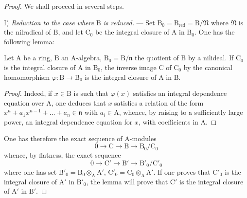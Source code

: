 \begin{proof}
We shall proceed in several steps.

I) \emph{Reduction to the case where} $\mathrm{B}$ \emph{is reduced.} --- Set $\mathrm{B}_0=\mathrm{B}_{\mathrm{red}}=\mathrm{B}/\mathfrak{N}$ where $\mathfrak{N}$ is the
nilradical of $\mathrm{B}$, and let $\mathrm{C}_0$ be the integral closure of $\mathrm{A}$ in $\mathrm{B}_0$. One has the following lemma:

\begin{lemma}[6.14.4.1]
\label{IV.6.14.4.1}
Let $\mathrm{A}$ be a ring, $\mathrm{B}$ an $\mathrm{A}$-algebra, $\mathrm{B}_0=\mathrm{B}/\mathfrak{n}$ the quotient of $\mathrm{B}$
by a nilideal. If $\mathrm{C}_0$ is the integral closure of $\mathrm{A}$ in $\mathrm{B}_0$, the inverse image $\mathrm{C}$ of $\mathrm{C}_0$ by
the canonical homomorphism $\varphi:\mathrm{B}\to\mathrm{B}_0$ is the integral closure of $\mathrm{A}$ in $\mathrm{B}$.
\end{lemma}

\begin{proof}
Indeed, if $x\in\mathrm{B}$ is such that $\varphi(x)$ satisfies an integral dependence equation
over $\mathrm{A}$, one deduces that $x$ satisfies a relation of the form
$x^n+a_1 x^{n-1}+\ldots+a_n\in\mathfrak{n}$ with $a_i\in\mathrm{A}$, whence, by raising to a sufficiently large power, an
integral dependence equation for $x$, with coefficients in $\mathrm{A}$.
\end{proof}

One has therefore the exact sequence of $\mathrm{A}$-modules
\[
  0\to\mathrm{C}\to\mathrm{B}\to\mathrm{B}_0/\mathrm{C}_0
\]
whence, by flatness, the exact sequence
\[
  0\to\mathrm{C}'\to\mathrm{B}'\to\mathrm{B}'_0/\mathrm{C}'_0
\]
where one has set $\mathrm{B}'_0=\mathrm{B}_0\otimes_\mathrm{A}\mathrm{A}'$, $\mathrm{C}'_0=\mathrm{C}_0\otimes_\mathrm{A}\mathrm{A}'$. If one proves that $\mathrm{C}'_0$ is the integral
closure of $\mathrm{A}'$ in $\mathrm{B}'_0$, the lemma  will prove that $\mathrm{C}'$ is the integral
closure of $\mathrm{A}'$ in $\mathrm{B}'$.



\end{proof}
